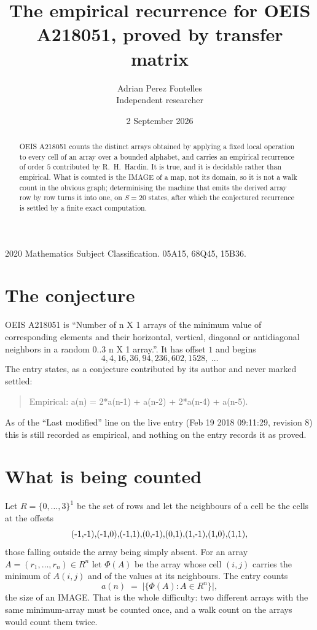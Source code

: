 \documentclass[11pt,a4paper]{article}
\title{The empirical recurrence for OEIS A218051, proved by transfer matrix}
\author{Adrian Perez Fontelles\\ \small Independent researcher}
\date{2 September 2026}
\theoremstyle{plain}
\theoremstyle{definition}
\begin{document}
\maketitle

\begin{abstract}
OEIS A218051 counts the distinct arrays obtained by applying a fixed local operation to every cell
of an array over a bounded alphabet, and carries an empirical recurrence of order $5$
contributed by R.~H.~Hardin. It is true, and it is decidable rather than empirical. What is
counted is the IMAGE of a map, not its domain, so it is not a walk count in the obvious graph;
determinising the machine that emits the derived array row by row turns it into one, on
$S=20$ states, after which the conjectured recurrence is settled by a finite exact
computation.
\end{abstract}

\noindent\small 2020 Mathematics Subject Classification. 05A15, 68Q45, 15B36.\normalsize

\section{The conjecture}

OEIS A218051 is ``Number of n X 1 arrays of the minimum value of corresponding elements and their horizontal, vertical, diagonal or antidiagonal neighbors in a random 0..3 n X 1 array.''. It has offset $1$ and begins
\[
4, 4, 16, 36, 94, 236, 602, 1528,\ \dots
\]
The entry states, as a conjecture contributed by its author and never marked settled:
\begin{quote}
Empirical: a(n) = 2*a(n-1) + a(n-2) + 2*a(n-4) + a(n-5).
\end{quote}
As of the ``Last modified'' line on the live entry (Feb 19 2018 09:11:29, revision 8) this is still
recorded as empirical, and nothing on the entry records it as proved.

\section{What is being counted}

Let $R=\{0,\dots,3\}^{1}$ be the set of rows and let the neighbours of
a cell be the cells at the offsets
\[
$(-1,-1)$, $(-1,0)$, $(-1,1)$, $(0,-1)$, $(0,1)$, $(1,-1)$, $(1,0)$, $(1,1)$,
\]
those falling outside the array being simply absent. For an array
$A=(r_1,\dots,r_n)\in R^n$ let $\Phi(A)$ be the array whose cell $(i,j)$ carries the
minimum of $A(i,j)$ and of the values at its neighbours. The entry counts
\[
a(n)\;=\;\bigl|\{\Phi(A):A\in R^n\}\bigr| ,
\]
the size of an IMAGE. That is the whole difficulty: two different arrays with the same
minimum-array must be counted once, and a walk count on the arrays would count them twice.
\end{document}
